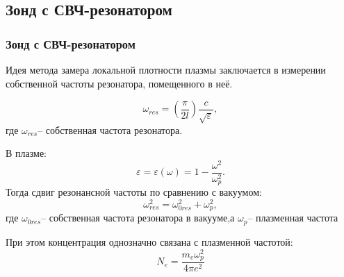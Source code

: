 \documentclass[10pt,pdf,hyperref={unicode}, dvipsnames]{beamer}
\begin{document}

		
	

\subsection{Зонд с СВЧ-резонатором} %

\begin{frame}
	\frametitle{Зонд с СВЧ-резонатором}
	Идея метода замера локальной  плотности плазмы заключается в измерении собственной частоты резонатора, помещенного в неё.

	\begin{equation}
		\omega_{res}=\left(\frac\pi{2l}\right)\frac c{\sqrt{\varepsilon}},
	\end{equation}
	где $\omega_{res}$-- собственная частота резонатора.

	В плазме: $$\varepsilon=\varepsilon(\omega)=1-\frac{\omega^2}{\omega_p^2}.$$ 
	Тогда сдвиг резонансной частоты по сравнению с вакуумом:
	$$\omega_{res}^2=\omega_{0res}^2+\omega_p^2,$$ 
	где $\omega_{0res}$-- собственная частота резонатора в вакууме,а $\omega_p$-- плазменная частота

	При этом концентрация однозначно связана с плазменной частотой:
	\begin{equation}
		N_e=\frac{m_e\omega^2_p}{4\pi e^2}
	\end{equation}
\end{frame}
\end{document}
